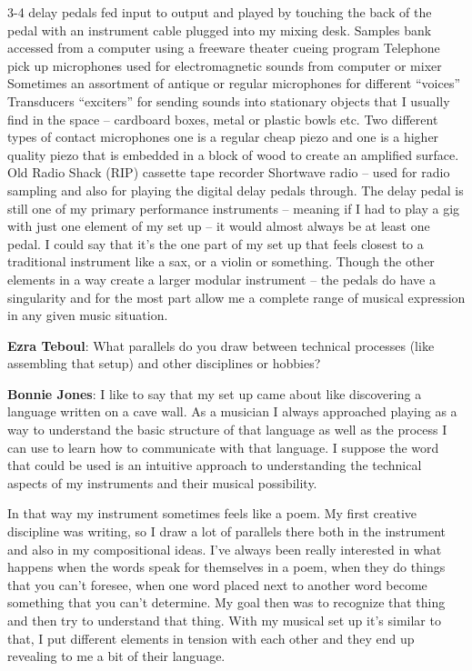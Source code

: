 3-4 delay pedals fed input to output and played by touching the back of the pedal with an instrument cable plugged into my mixing desk. 
Samples bank accessed from a computer using a freeware theater cueing program 
Telephone pick up microphones used for electromagnetic sounds from computer or mixer
Sometimes an assortment of antique or regular microphones for different ``voices'' 
Transducers ``exciters'' for sending sounds into stationary objects that I usually find in the space – cardboard boxes, metal or plastic bowls etc. 
Two different types of contact microphones one is a regular cheap piezo and one is a higher quality piezo that is embedded in a block of wood to create an amplified surface. 
Old Radio Shack (RIP) cassette tape recorder
Shortwave radio – used for radio sampling and also for playing the digital delay pedals through. 
The delay pedal is still one of my primary performance instruments – meaning if I had to play a gig with just one element of my set up – it would almost always be at least one pedal. I could say that it’s the one part of my set up that feels closest to a traditional instrument like a sax, or a violin or something. Though the other elements in a way create a larger modular instrument – the pedals do have a singularity and for the most part allow me a complete range of musical expression in any given music situation. 

\textbf{Ezra Teboul}: What parallels do you draw between technical processes (like assembling that setup) and other disciplines or hobbies? 

\textbf{Bonnie Jones}: I like to say that my set up came about like discovering a language written on a cave wall. As a musician I always approached playing as a way to understand the basic structure of that language as well as the process I can use to learn how to communicate with that language. I suppose the word that could be used is an intuitive approach to understanding the technical aspects of my instruments and their musical possibility. 

In that way my instrument sometimes feels like a poem. My first creative discipline was writing, so I draw a lot of parallels there both in the instrument and also in my compositional ideas. I’ve always been really interested in what happens when the words speak for themselves in a poem, when they do things that you can’t foresee, when one word placed next to another word become something that you can’t determine. My goal then was to recognize that thing and then try to understand that thing. With my musical set up it’s similar to that, I put different elements in tension with each other and they end up revealing to me a bit of their language.

